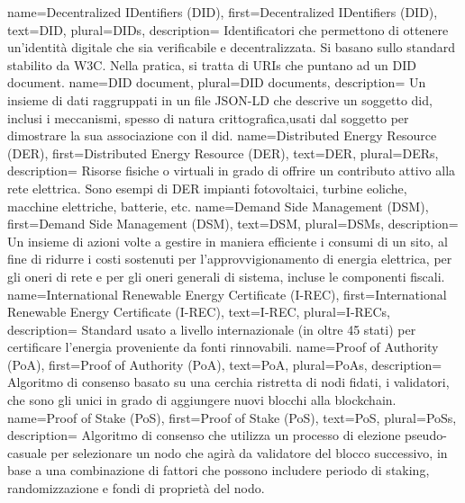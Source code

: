 {
    name={Decentralized IDentifiers (DID)},
    first={Decentralized IDentifiers (DID)},
    text={DID},
    plural={DIDs},
    description={
            Identificatori che permettono di ottenere un'identità digitale che sia verificabile e decentralizzata.
            Si basano sullo standard stabilito da W3C.
            Nella pratica, si tratta di URIs che puntano ad un DID document.
        }
}
{
    name={DID document},
    plural={DID documents},
    description={
            Un insieme di dati raggruppati in un file JSON-LD che descrive un soggetto \gls{did}, inclusi i meccanismi, 
            spesso di natura crittografica,usati dal soggetto per dimostrare la sua associazione con il \gls{did}.
        }
}
{
    name={Distributed Energy Resource (DER)},
    first={Distributed Energy Resource (DER)},
    text={DER},
    plural={DERs},
    description={
            Risorse fisiche o virtuali in grado di offrire un contributo attivo alla rete elettrica.
            Sono esempi di DER impianti fotovoltaici, turbine eoliche, macchine elettriche, batterie, etc.
        }
}
{
    name={Demand Side Management (DSM)},
    first={Demand Side Management (DSM)},
    text={DSM},
    plural={DSMs},
    description={
            Un insieme di azioni volte a gestire in maniera efficiente i consumi di un sito,
            al fine di ridurre i costi sostenuti per l’approvvigionamento di energia elettrica,
            per gli oneri di rete e per gli oneri generali di sistema, incluse le componenti fiscali.
        }
}
{
    name={International Renewable Energy Certificate (I-REC)},
    first={International Renewable Energy Certificate (I-REC)},
    text={I-REC},
    plural={I-RECs},
    description={
            Standard usato a livello internazionale (in oltre 45 stati) per certificare l'energia proveniente da fonti rinnovabili.
        }
}
{
    name={Proof of Authority (PoA)},
    first={Proof of Authority (PoA)},
    text={PoA},
    plural={PoAs},
    description={
            Algoritmo di consenso basato su una cerchia ristretta di nodi fidati, i validatori,
            che sono gli unici in grado di aggiungere nuovi blocchi alla blockchain.
        }
}
{
    name={Proof of Stake (PoS)},
    first={Proof of Stake (PoS)},
    text={PoS},
    plural={PoSs},
    description={
            Algoritmo di consenso che utilizza un processo di elezione pseudo-casuale per selezionare un nodo che agirà da validatore del blocco successivo,
            in base a una combinazione di fattori che possono includere periodo di staking, randomizzazione e fondi di proprietà del nodo.
        }
}
